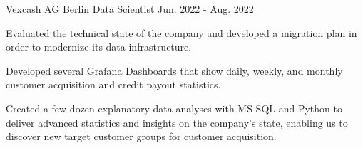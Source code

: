 

\begin{cventries}

  \cventry
    {Vexcash AG}
    {Berlin}
    {Data Scientist}
    {Jun. 2022 - Aug. 2022}
    {
      \begin{cvitems}
        \item{Evaluated the technical state of the company and developed a migration plan in order to modernize its data infrastructure.}
        \item{Developed several Grafana Dashboards that show daily, weekly, and monthly customer acquisition and credit payout statistics.}
        \item{Created a few dozen explanatory data analyses with MS SQL and Python to deliver advanced statistics and insights on the company’s state, enabling us to discover new target customer groups for customer acquisition.}
      \end{cvitems}
    }


\end{cventries}
